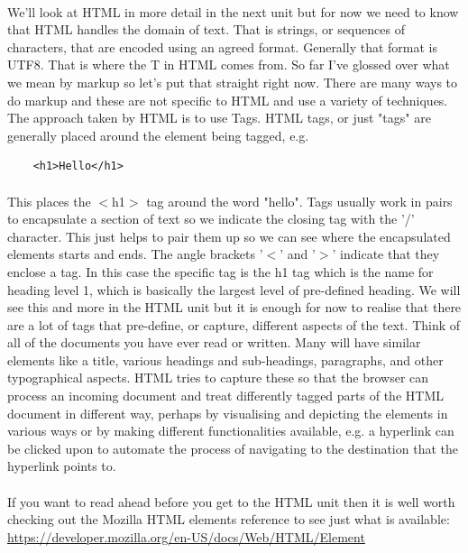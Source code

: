 \paragraph{} We'll look at HTML in more detail in the next unit but for now we need to know that HTML handles  the domain of text. That is strings, or sequences of characters, that are encoded using an agreed format. Generally that format is UTF8. That is where the T in HTML comes from. So far I've glossed over what we mean by markup so let's put that straight right now. There are many ways to do markup and these are not specific to HTML and use a variety of techniques. The approach taken by HTML is to use Tags. HTML tags, or just "tags" are generally placed around the element being tagged, e.g. 
\begin{lstlisting}
    <h1>Hello</h1> 
\end{lstlisting}

\paragraph{} This places the $<$h1$>$ tag around the word "hello". Tags usually work in pairs to encapsulate a section of text so we indicate the closing tag with the '/' character. This just helps to pair them up so we can see where the encapsulated elements starts and ends. The angle brackets '$<$' and '$>$' indicate that they enclose a tag. In this case the specific tag is the h1 tag which is the name for heading level 1, which is basically the largest level of pre-defined heading. We will see this and more in the HTML unit but it is enough for now to realise that there are a lot of tags that pre-define, or capture,  different aspects of the text. Think of all of the documents you have ever read or written. Many will have similar elements like a title, various headings and sub-headings, paragraphs, and other typographical aspects. HTML tries to capture these so that the browser can process an incoming document and treat differently tagged parts of the HTML document in different way, perhaps by visualising and depicting the elements in various ways or by making different functionalities available, e.g. a hyperlink can be clicked upon to automate the process of navigating to the destination that the hyperlink points to.
\paragraph{} If you want to read ahead before you get to the HTML unit then it is well worth checking out the Mozilla HTML elements reference to see just what is available:
	\url{https://developer.mozilla.org/en-US/docs/Web/HTML/Element}


